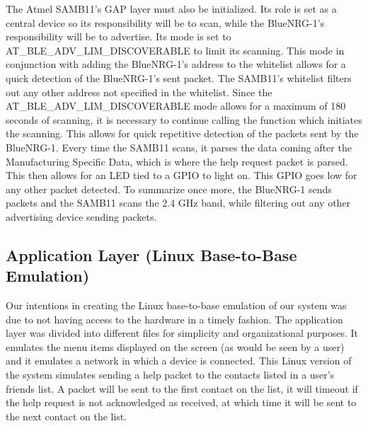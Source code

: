 \documentclass[journal,compsoc]{IEEEtran}
\begin{document}
\noindent The Atmel SAMB11’s GAP layer must also be initialized.  Its role is set as a central device so its responsibility will be to scan, while the BlueNRG-1’s responsibility will be to advertise.  Its mode is set to AT\_BLE\_ADV\_LIM\_DISCOVERABLE to limit its scanning.  This mode in conjunction with adding the BlueNRG-1’s address to the whitelist allows for a quick detection of the BlueNRG-1’s sent packet.  The SAMB11’s whitelist filters out any other address not specified in the whitelist.  Since the AT\_BLE\_ADV\_LIM\_DISCOVERABLE mode allows for a maximum of 180 seconds of scanning, it is necessary to continue calling the function which initiates the scanning.  This allows for quick repetitive detection of the packets sent by the BlueNRG-1.  Every time the SAMB11 scans, it parses the data coming after the Manufacturing Specific Data, which is where the help request packet is parsed.  This then allows for an LED tied to a GPIO to light on.  This GPIO goes low for any other packet detected.  To summarize once more, the BlueNRG-1 sends packets and the SAMB11 scans the 2.4 GHz band, while filtering out any other advertising device sending packets.

\subsection{Application Layer (Linux Base-to-Base Emulation)}
Our intentions in creating the Linux base-to-base emulation of our system was due to not having access to the hardware in a timely fashion.  The application layer was divided into different files for simplicity and organizational purposes.  It emulates the menu items displayed on the screen (as would be seen by a user) and it emulates a network in which a device is connected.  This Linux version of the system simulates sending a help packet to the contacts listed in a user’s friends list.  A packet will be sent to the first contact on the list, it will timeout if the help request is not acknowledged as received, at which time it will be sent to the next contact on the list.

%
%
\end{document}
